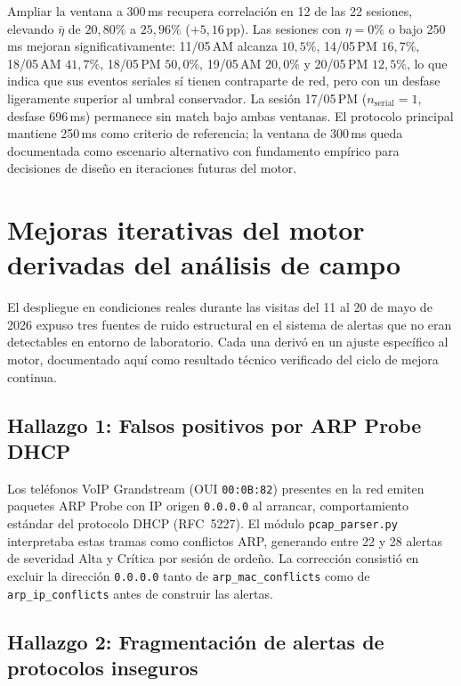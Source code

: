 Ampliar la ventana a 300\,ms recupera correlación en 12 de las 22 sesiones, elevando $\bar{\eta}$ de $20{,}80\%$ a $25{,}96\%$ ($+5{,}16$\,pp). Las sesiones con $\eta=0\%$ o bajo 250\,ms mejoran significativamente: 11/05\,AM alcanza $10{,}5\%$, 14/05\,PM $16{,}7\%$, 18/05\,AM $41{,}7\%$, 18/05\,PM $50{,}0\%$, 19/05\,AM $20{,}0\%$ y 20/05\,PM $12{,}5\%$, lo que indica que sus eventos seriales sí tienen contraparte de red, pero con un desfase ligeramente superior al umbral conservador. La sesión 17/05\,PM ($n_{\text{serial}}=1$, desfase 696\,ms) permanece sin match bajo ambas ventanas. El protocolo principal mantiene 250\,ms como criterio de referencia; la ventana de 300\,ms queda documentada como escenario alternativo con fundamento empírico para decisiones de diseño en iteraciones futuras del motor.

\section{Mejoras iterativas del motor derivadas del análisis de campo}
\label{sec:mejoras-motor}

El despliegue en condiciones reales durante las visitas del 11 al 20 de mayo de 2026 expuso tres fuentes de ruido estructural en el sistema de alertas que no eran detectables en entorno de laboratorio. Cada una derivó en un ajuste específico al motor, documentado aquí como resultado técnico verificado del ciclo de mejora continua.

\subsection*{Hallazgo 1: Falsos positivos por ARP Probe DHCP}

Los teléfonos VoIP Grandstream (OUI \texttt{00:0B:82}) presentes en la red emiten paquetes ARP Probe con IP origen \texttt{0.0.0.0} al arrancar, comportamiento estándar del protocolo DHCP (RFC~5227). El módulo \texttt{pcap\_parser.py} interpretaba estas tramas como conflictos ARP, generando entre 22 y 28 alertas de severidad Alta y Crítica por sesión de ordeño. La corrección consistió en excluir la dirección \texttt{0.0.0.0} tanto de \texttt{arp\_mac\_conflicts} como de \texttt{arp\_ip\_conflicts} antes de construir las alertas.

\subsection*{Hallazgo 2: Fragmentación de alertas de protocolos inseguros}

